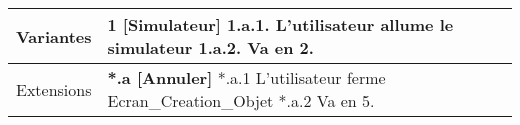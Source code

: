 \begin{longtable}[l]{|p{3cm}|p{11.7cm}|}
    Variantes &     \newline
        \textbf{1 [Simulateur]} \newline
        1.a.1. L'utilisateur allume le simulateur \newline
        1.a.2. Va en 2. \newline
        \\
    \hline

        Extensions & 
        \textbf{*.a [Annuler]} \newline
        *.a.1 L'utilisateur ferme Ecran\_Creation\_Objet \newline
        *.a.2 Va en 5. \newline
        \\
    \hline
\end{longtable}